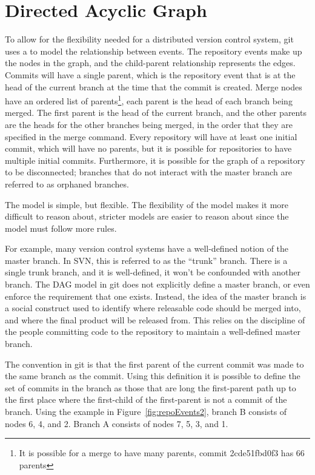 \section{Directed Acyclic Graph}
\label{sec:directed_acyclic_graph}

To allow for the flexibility needed for a distributed version control
system, git uses a  to model the
relationship between events.
The repository events make up the nodes in the graph, and the
child-parent relationship represents the edges.
Commits will have a single parent, which is the repository event that
is at the head of the current branch at the time that the commit
is created.
Merge nodes have an ordered list of
parents\footnote{It is possible for a merge to have many parents, commit
  2cde51fbd0f3 has 66 parents},
each parent is the head of each branch being merged.
The first parent is the head of the current branch, and the other
parents are the heads for the other branches being merged, in the order
that they are specified in the merge command.
Every repository will have at least one initial commit, which
will have no parents, but it is possible for repositories to have
multiple initial commits.
Furthermore, it is possible for the graph of a repository to be
disconnected; branches that do not interact with the master branch are
referred to as orphaned branches.

The model is simple, but flexible.
The flexibility of the model makes it more difficult to reason about,
stricter models are easier to reason about since the model must follow
more rules.

For example, many version control systems have a well-defined notion of
the master branch.
In SVN, this is referred to as the ``trunk'' branch.
There is a single trunk branch, and it is well-defined, it won't be
confounded with another branch.
The DAG model in git does not explicitly define a master branch, or even
enforce the requirement that one exists.
Instead, the idea of the master branch is a social construct used to
identify where releasable code should be merged into, and where the
final product will be released from.
This relies on the discipline of the people committing code to the
repository to maintain a well-defined master branch.

The convention in git is that the first parent of the current commit was
made to the same branch as the commit. Using this definition it is
possible to define the set of commits in the branch as those that are
long the first-parent path up to the first place where the first-child
of the first-parent is not a commit of the branch.
Using the example in Figure~\ref{fig:repoEvents2}, branch B consists of
nodes 6, 4, and 2. Branch A consists of nodes 7, 5, 3, and 1.


